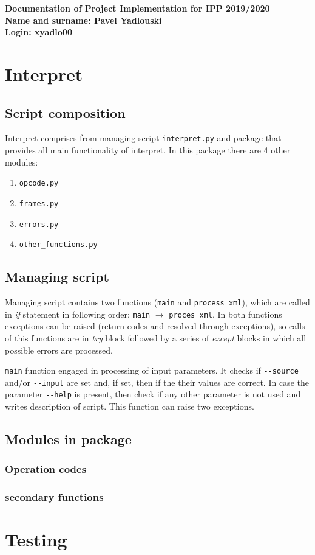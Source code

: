 \documentclass[10pt,a4paper]{article}
\begin{document}
\noindent\textbf{Documentation of Project Implementation for IPP 2019/2020\\
Name and surname: Pavel Yadlouski\\
Login: xyadlo00\\}

\section{Interpret}
\subsection{Script composition}
Interpret comprises from managing script \texttt{interpret.py} and package that
provides all main functionality of interpret. In this package there are 4 other
modules:
\begin{enumerate}
    \item \texttt{opcode.py}
    \item \texttt{frames.py}
    \item \texttt{errors.py}
    \item \texttt{other\_functions.py}
\end{enumerate}

\subsection{Managing script}
Managing script contains two functions (\texttt{main} and \texttt{process\_xml}),
which are called in \textit{if} statement in following order: \texttt{main} 
$\rightarrow$ \texttt{proces\_xml}. In both functions exceptions can be raised 
(return codes and resolved through exceptions), 
so calls of this functions are in \textit{try} block followed by a series of 
\textit{except} blocks in which all possible errors are processed.

\texttt{main} function engaged in processing of input parameters. It checks if 
\texttt{-{}-source} and/or \texttt{-{}-input} are set and, if set, then if the
their values are correct. In case the parameter \texttt{-{}-help} is present,
then check if any other parameter is not used and writes description of script.
This function can raise two exceptions.

\subsection{Modules in package}

\subsubsection{Operation codes}

\subsubsection{secondary functions}

\section{Testing}
\end{document}
